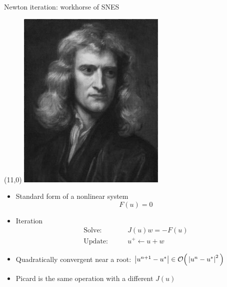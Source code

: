 \begin{frame}{Newton iteration: workhorse of SNES}
  \begin{textblock}{3}(11,0)
    \includegraphics[width=\textwidth]{figures/Newton}
  \end{textblock}
  \begin{itemize}
  \item Standard form of a nonlinear system
    \[ F(u) = 0 \]
  \item Iteration
    \begin{align*}
      \text{Solve:} & \qquad J(u) w = -F(u) \\
      \text{Update:} & \qquad u^+ \gets u + w
    \end{align*}
    \item Quadratically convergent near a root: $\left\lvert u^{n+1}-u^* \right\rvert \in \mathcal{O}\Big(\left\lvert u^n-u^* \right\rvert^2\Big)$
    \item Picard is the same operation with a different $J(u)$
  \end{itemize}
  \begin{example}
    \begin{align*}

\end{align*}
\end{example}
\end{frame}
